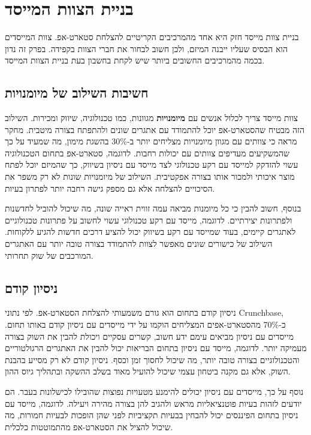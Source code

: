 \chapter{בניית הצוות המייסד}

בניית צוות מייסד חזק היא אחד מהמרכיבים הקריטיים להצלחת סטארט-אפ. צוות המייסדים הוא הבסיס שעליו ייבנה המיזם, ולכן חשוב לבחור את חברי הצוות בקפידה. בפרק זה נדון בכמה מהמרכיבים החשובים ביותר שיש לקחת בחשבון בעת בניית הצוות המייסד.

\section{חשיבות השילוב של מיומנויות}

צוות מייסד צריך לכלול אנשים עם \textbf{מיומנויות} מגוונות, כמו טכנולוגיה, שיווק ומכירות. השילוב הזה מבטיח שהסטארט-אפ יוכל להתמודד עם אתגרים שונים ולהתפתח בצורה מיטבית. מחקר מראה כי צוותים עם מגוון מיומנויות מצליחים יותר ב-30\% בהשגת מימון, מה שמעיד על כך שהמשקיעים מעדיפים צוותים עם יכולות רחבות. לדוגמה, סטארט-אפ בתחום הטכנולוגיה עשוי להזדקק למייסד עם רקע טכנולוגי לצד מייסד עם ניסיון בשיווק, כך שהמיזם יוכל לפתח מוצר איכותי ולמכור אותו בצורה אפקטיבית. השילוב של מיומנויות שונות לא רק משפר את הסיכויים להצלחה אלא גם מספק גישה רחבה יותר לפתרון בעיות.

בנוסף, חשוב להבין כי כל מיומנות מביאה עמה זווית ראייה שונה, מה שיכול להוביל לחדשנות ולפתרונות יצירתיים. לדוגמה, מייסד עם רקע טכנולוגי עשוי לחשוב על פתרונות טכנולוגיים לאתגרים קיימים, בעוד שמייסד עם רקע בשיווק יכול להציע דרכים חדשות להגיע ללקוחות. השילוב של כישורים שונים מאפשר לצוות להתמודד בצורה טובה יותר עם האתגרים המורכבים של שוק תחרותי.

\section{ניסיון קודם}

ניסיון קודם בתחום הוא גורם משמעותי להצלחת הסטארט-אפ. לפי נתוני Crunchbase, כ-70\% מהסטארט-אפים המצליחים הוקמו על ידי מייסדים עם ניסיון קודם באותו תחום. מייסדים עם ניסיון מביאים עימם ידע חשוב, קשרים עסקיים ויכולת להבין את השוק בצורה מעמיקה יותר. לדוגמה, מייסד עם ניסיון בתחום הבריאות יכול להבין את האתגרים הרגולטוריים והטכנולוגיים בצורה טובה יותר, מה שיכול לחסוך זמן וכסף. ניסיון קודם לא רק מסייע בהבנת השוק, אלא גם מקנה ביטחון עצמי שיכול להועיל מאוד בשלב ההשקה ובתהליך גיוס ההון.

נוסף על כך, מייסדים עם ניסיון יכולים להימנע מטעויות נפוצות שהובילו לכישלונות בעבר. הם יודעים לזהות בעיות פוטנציאליות מראש ולהגיב להן בצורה מהירה ויעילה. לדוגמה, מייסד עם ניסיון בתחום הפיננסים יכול להבחין בבעיות תקציביות לפני שהן הופכות לבעיות חמורות, מה שיכול להציל את הסטארט-אפ מהתמוטטות כלכלית.

